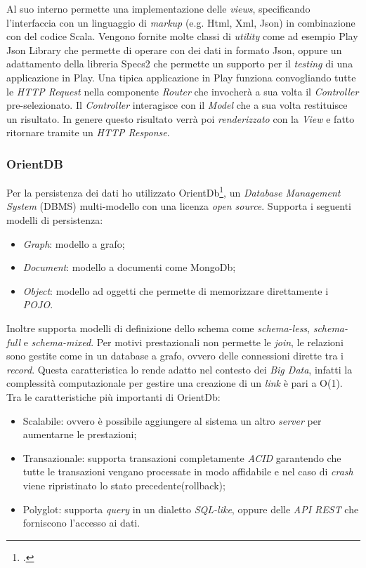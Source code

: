 Al suo interno permette una implementazione delle \emph{views}, specificando l'interfaccia con un linguaggio di \emph{markup} (e.g. Html, Xml, Json) in combinazione con del codice Scala. Vengono fornite molte classi di \emph{utility} come ad esempio Play Json Library che permette di operare con dei dati in formato Json, oppure un adattamento della libreria Specs2 che permette un supporto per il \emph{testing} di una applicazione in Play. Una tipica applicazione in Play funziona convogliando tutte le \emph{HTTP Request} nella componente \emph{Router} che invocherà a sua volta il \emph{Controller} pre-selezionato. Il \emph{Controller} interagisce con il \emph{Model} che a sua volta restituisce un risultato. In genere questo risultato verrà poi \emph{renderizzato} con la \emph{View} e fatto ritornare tramite un \emph{HTTP Response}.
\subsubsection{OrientDB}
Per la persistenza dei dati ho utilizzato OrientDb\footcite{http://orientdb.com/}, un \emph{Database Management System} (DBMS) multi-modello con una licenza \emph{open source}. Supporta i seguenti modelli di persistenza:
\begin{itemize}
\item \emph{Graph}: modello a grafo; 
\item \emph{Document}: modello a documenti come MongoDb;
\item \emph{Object}: modello ad oggetti che permette di memorizzare direttamente i \emph{POJO}.
\end{itemize}
Inoltre supporta modelli di definizione dello schema come \emph{schema-less}, \emph{schema-full} e \emph{schema-mixed}. Per motivi prestazionali non permette le \emph{join}, le relazioni sono gestite come in un database a grafo, ovvero delle connessioni dirette tra i \emph{record}. Questa caratteristica lo rende adatto nel contesto dei \emph{Big Data}, infatti la complessità computazionale per gestire una creazione di un \emph{link} è pari a O(1). Tra le caratteristiche più importanti di OrientDb:
\begin{itemize}
\item Scalabile: ovvero è possibile aggiungere al sistema un altro \emph{server} per aumentarne le prestazioni;
\item Transazionale: supporta transazioni completamente \emph{ACID} garantendo che tutte le transazioni  vengano processate in modo affidabile e nel caso di \emph{crash} viene ripristinato lo stato precedente(rollback);
\item Polyglot: supporta \emph{query} in un dialetto \emph{SQL-like}, oppure delle \emph{API REST} che forniscono l'accesso ai dati.
\end{itemize}
